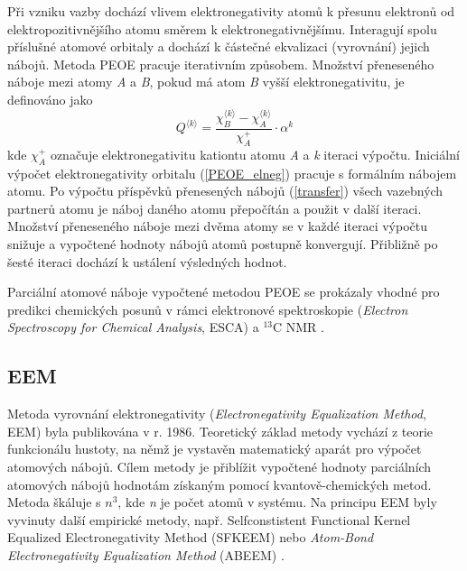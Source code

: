 Při vzniku vazby dochází vlivem elektronegativity atomů k přesunu elektronů od elektropozitivnějšího atomu směrem k elektronegativnějšímu. Interagují spolu přísluš\-né atomové orbitaly a dochází k částečné ekvalizaci (vyrovnání) jejich nábojů. Metoda PEOE pracuje iterativním způsobem. Množ\-ství přeneseného náboje mezi atomy \textit{A} a \textit{B}, pokud má atom \textit{B} vyšší elektronegativitu, je definováno jako 
\begin{equation}
\label{transfer}
    Q^{\langle k \rangle} = \frac{\chi_B^{\langle k \rangle} - \chi_A^{\langle k \rangle}}{\chi_A^+} \cdot \alpha^k
\end{equation}
kde $\chi_A^+$ označuje elektronegativitu kationtu atomu \textit{A} a \textit{k} iteraci výpočtu. Iniciální výpočet elektronegativity orbitalu (\ref{PEOE_elneg}) pracuje s formálním nábojem atomu. Po výpočtu příspěvků přenesených nábojů (\ref{transfer}) všech vazebných partnerů atomu je náboj daného atomu přepočítán a použit v další iteraci. Množství přeneseného náboje mezi dvěma atomy se v každé iteraci výpočtu snižuje a vypočtené hodnoty nábojů atomů postupně konvergují. Přibližně po šesté iteraci dochází k ustálení výsledných hodnot. 

Parciální atomové náboje vypočtené metodou PEOE se prokázaly vhodné pro predikci chemických posunů v rámci elektronové spektroskopie (\textit{Electron Spectroscopy for Chemical Analysis}, ESCA) \cite{GM} a ${}^{13}_{}\text{C}$ NMR \cite{PEOE_nmr}. 

\subsection{EEM}
Metoda vyrovnání elektronegativity (\textit{Electronegativity Equalization Method}, EEM) \cite{eem} byla publikována v r. 1986. Teoretický základ metody vychází z teorie funkcionálu hustoty, na němž je vystavěn matematický aparát pro výpočet atomových nábojů. Cílem metody je přiblížit vypočtené hodnoty parciálních atomových nábojů hodnotám získaným pomocí kvantově-chemických metod. Metoda škáluje s $n^3$, kde \textit{n} je počet atomů v systému. Na principu EEM byly vyvinuty další empirické metody, např. Selfconstistent Functional Kernel Equalized Electronegativity Method (SFKEEM) \cite{sfkeem} nebo \textit{Atom-Bond Electronegativity Equalization Method} (ABEEM) \cite{abeem1, abeem2}.

